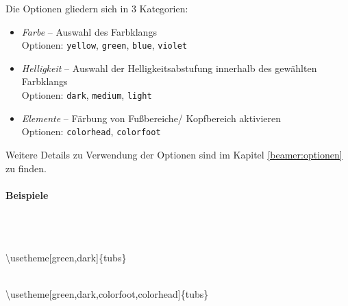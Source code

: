 Die Optionen gliedern sich in 3 Kategorien:
\begin{itemize}
  \item \emph{Farbe} -- Auswahl des Farbklangs\\
    Optionen: \texttt{yellow}, \texttt{green}, \texttt{blue}, \texttt{violet}
  \item \emph{Helligkeit} -- Auswahl der Helligkeitsabstufung
    innerhalb des gewählten Farbklangs\\
    Optionen: \texttt{dark}, \texttt{medium}, \texttt{light}
  \item \emph{Elemente} -- Färbung von Fußbereiche/ Kopfbereich aktivieren\\
    Optionen: \texttt{colorhead}, \texttt{colorfoot}
\end{itemize}

Weitere Details zu Verwendung der Optionen sind im Kapitel \ref{beamer:optionen}
zu finden.

\clearpage
\paragraph{Beispiele}\hfill\\

\begin{center}
\begin{minipage}{0.49\textwidth}
\end{minipage}\hfill
\begin{minipage}{0.49\textwidth}
\end{minipage}\medskip\\
{\ttfamily \textbackslash usetheme[green,dark]\{tubs\}}
\end{center}

\begin{center}
\begin{minipage}{0.49\textwidth}
\end{minipage}
\begin{minipage}{0.49\textwidth}
\end{minipage}\medskip\\
{\ttfamily \textbackslash usetheme[green,dark,colorfoot,colorhead]\{tubs\}}
\end{center}

